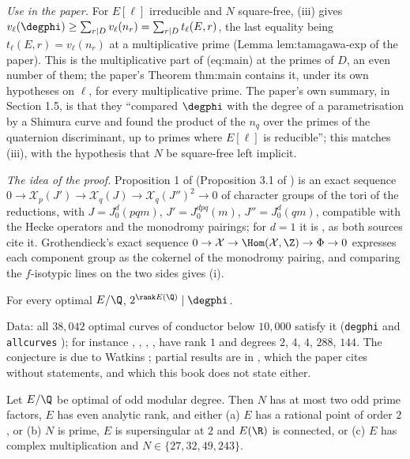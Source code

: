 \begin{remark}
\emph{Use in the paper.} For $E[\ell]$ irreducible and $N$ square-free, (iii) gives
$v_\ell(\degphi)\ge\sum_{r\mid D}v_\ell(n_r)=\sum_{r\mid D}t_\ell(E,r)$, the last equality being $t_\ell(E,r)=v_\ell(n_r)$ at a multiplicative prime (Lemma lem:tamagawa-exp of the paper). This is
the multiplicative part of (eq:main) at the primes of $D$, an even number of them; the paper's Theorem thm:main contains it, under its own hypotheses on $\ell$, for every multiplicative prime. The
paper's own summary, in Section 1.5, is that they ``compared $\degphi$ with the degree of a parametrisation by a Shimura curve and found the product of the $n_q$ over the primes of the quaternion
discriminant, up to primes where $E[\ell]$ is reducible''; this matches (iii), with the hypothesis that $N$ be square-free left implicit.

\emph{The idea of the proof.} Proposition 1 of \cite{RibetTakahashi97} (Proposition 3.1 of \cite{Takahashi01}) is an exact sequence $0\to\mathcal X_p(J')\to\mathcal X_q(J)\to\mathcal X_q(J'')^2\to0$
of character groups of the tori of the reductions, with $J=J_0^d(pqm)$, $J'=J_0^{dpq}(m)$, $J''=J_0^d(qm)$, compatible with the Hecke operators and the monodromy pairings; for $d=1$ it is
\cite[Theorem 4.1]{Ribet90}, as both sources cite it. Grothendieck's exact sequence $0\to\mathcal X\to\Hom(\mathcal X,\Z)\to\Phi\to0$ expresses each component group as the cokernel of the
monodromy pairing, and comparing the $f$-isotypic lines on the two sides gives (i).
\end{remark}

\begin{conjecture}[Watkins]\label{conj:moddeg:watkins}
For every optimal $E/\Q$, $2^{\rank E(\Q)}\mid\degphi$.
\end{conjecture}

Data: all $38{,}042$ optimal curves of conductor below $10{,}000$ satisfy it (\texttt{degphi} and \texttt{allcurves} \cite{ecdata}); for instance , , , , 
have rank $1$ and degrees $2$, $4$, $4$, $288$, $144$. The conjecture is due to Watkins \cite{Watkins02}; partial results are in \cite{Dummigan06,CalegariEmerton09,Yazdani11,CaroPasten22,HatleyKundu,BKP}, which the
paper cites without statements, and which this book does not state either.

\begin{theorem}\label{thm:moddeg:calegari-emerton}
Let $E/\Q$ be optimal of odd modular degree. Then $N$ has at most two odd prime factors, $E$ has even analytic rank, and either (a) $E$ has a rational point of order $2$, or (b) $N$ is prime, $E$
is supersingular at $2$ and $E(\R)$ is connected, or (c) $E$ has complex multiplication and $N\in\{27,32,49,243\}$.
\end{theorem}

